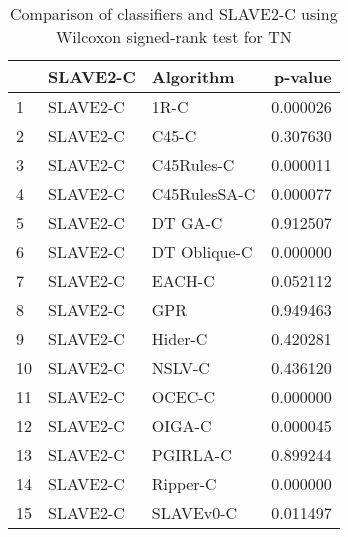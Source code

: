 \begin{table}
\footnotesize
\caption{Comparison of classifiers and SLAVE2-C using Wilcoxon signed-rank test for TN}
\label{tab:SLAVE2-C wilcoxon TN comparison}
\begin{tabular}{lllr}
\hline
 & SLAVE2-C & Algorithm & p-value \\
\hline
1 & SLAVE2-C & 1R-C & 0.000026 \\
2 & SLAVE2-C & C45-C & 0.307630 \\
3 & SLAVE2-C & C45Rules-C & 0.000011 \\
4 & SLAVE2-C & C45RulesSA-C & 0.000077 \\
5 & SLAVE2-C & DT GA-C & 0.912507 \\
6 & SLAVE2-C & DT Oblique-C & 0.000000 \\
7 & SLAVE2-C & EACH-C & 0.052112 \\
8 & SLAVE2-C & GPR & 0.949463 \\
9 & SLAVE2-C & Hider-C & 0.420281 \\
10 & SLAVE2-C & NSLV-C & 0.436120 \\
11 & SLAVE2-C & OCEC-C & 0.000000 \\
12 & SLAVE2-C & OIGA-C & 0.000045 \\
13 & SLAVE2-C & PGIRLA-C & 0.899244 \\
14 & SLAVE2-C & Ripper-C & 0.000000 \\
15 & SLAVE2-C & SLAVEv0-C & 0.011497 \\
\hline
\end{tabular}
\end{table}
